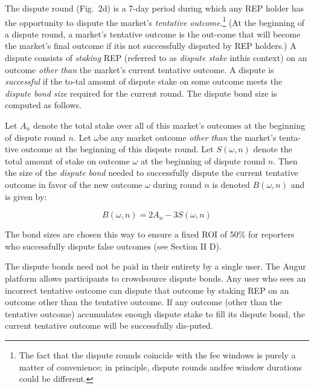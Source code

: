 \documentclass[12pt,floatfix,reprint,nofootinbib,amsmath,amssymb,epsfig,pre,floats,letterpaper,groupedaffiliation]{revtex4-1}
\newcommand{\beq}{\begin{equation}}
\newcommand{\eeq}{\end{equation}}
\theoremstyle{definition}
\theoremstyle{definition}
\begin{document}
The dispute round (Fig.~2d) is a 7-day period during which any REP holder has the opportunity to dispute the market's \textit{tentative outcome}.\footnote{The fact that the dispute rounds coincide with the fee windows is purely a matter of convenience; in principle, dispute rounds and\linebreak fee window durations could be different.} (At the beginning of a dispute round, a market's tentative outcome is the out-\linebreak come that will become the market's final outcome if it\linebreak is not successfully disputed by REP holders.) A dispute consists of \textit{staking} REP (referred to as \textit{dispute stake} in\linebreak this context) on an outcome \textit{other than} the market's current tentative outcome. A dispute is \textit{successful} if the to-\linebreak tal amount of dispute stake on some outcome meets the \textit{dispute bond size} required for the current round. The dispute bond size is computed as follows.

Let $A_n$ denote the total stake over all of this market's outcomes at the beginning of dispute round $n$. Let $\omega$\linebreak be any market outcome \textit{other than} the market's tenta-\linebreak tive outcome at the beginning of this dispute round. Let $S(\omega, n)$ denote the total amount of stake on outcome $\omega$ at the beginning of dispute round $n$. Then the size of the \textit{dispute bond} needed to successfully dispute the current tentative outcome in favor of the new outcome $\omega$ during round $n$ is denoted $B(\omega, n)$ and is given by:

\beq
B(\omega, n) = 2A_n - 3S(\omega, n)
\eeq

The bond sizes are chosen this way to ensure a fixed ROI of 50\% for reporters who successfully dispute false outcomes (see Section II D).

The dispute bonds need not be paid in their entirety by a single user. The Augur platform allows participants to crowdsource dispute bonds. Any user who sees an incorrect tentative outcome can dispute that outcome by staking REP on an outcome other than the tentative outcome. If any outcome (other than the tentative outcome) accumulates enough dispute stake to fill its dispute bond, the current tentative outcome will be successfully dis-\linebreak puted.
\end{document}
